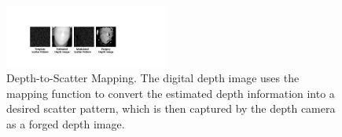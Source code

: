 


\begin{figure}[!t]
	\centering
	\includegraphics[width=0.48\textwidth]{figures/depth_mapping_1.pdf} 
	\vspace{-0.15in}
	\caption{Depth-to-Scatter Mapping. The digital depth image uses the mapping function to convert the estimated depth information into a desired scatter pattern, which is then captured by the depth camera as a forged depth image.}
	\label{depth_mapping}
	\vspace{-0.15in}
\end{figure}


